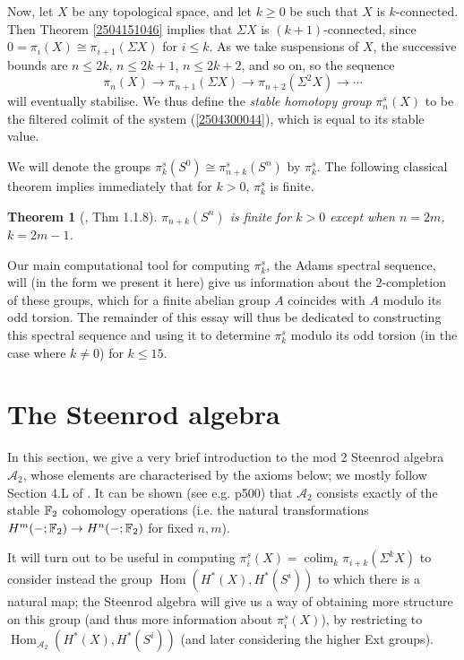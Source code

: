 \documentclass[11pt, titlepage]{article} %
\def\bb{\ensuremath\mathbb}
\def\A{\ensuremath{\mathscr{A}_2}}
\DeclareMathOperator{\colim}{colim}
\DeclareMathOperator{\Hom}{Hom}
\numberwithin{equation}{subsection}
\theoremstyle{plain}
\newtheorem{theorem}{Theorem}[subsection]
\theoremstyle{definition}
\begin{document}
Now, let \(X\) be any topological space, and let \(k\geq 0\) be such that \(X\) is \(k\)-connected. Then Theorem \ref{2504151046} implies that \(\Sigma X\) is \((k+1)\)-connected, since \(0=\pi_i(X)\cong \pi_{i+1}(\Sigma X)\) for \(i\leq k\). As we take suspensions of \(X\), the successive bounds are \(n \leq 2k\), \(n \leq 2k+1\), \(n\leq 2k+2\), and so on, so the sequence 
\begin{equation}\label{2504300044}
\pi_n(X)\to \pi_{n+1}(\Sigma X) \to \pi_{n+2}(\Sigma^2 X) \to \cdots
\end{equation}
will eventually stabilise. We thus define the \textit{stable homotopy group} \(\pi_n^s(X)\) to be the filtered colimit of the system (\ref{2504300044}), which is equal to its stable value. 

We will denote the groups \(\pi_k^s(S^0)\cong \pi^s_{n+k}(S^n)\) by \(\pi_k^s\). The following classical theorem implies immediately that for \(k>0\), \(\pi_k^s\) is finite.

\begin{theorem}[{\autocite{cobordism}, Thm 1.1.8}]
\(\pi_{n+k}(S^n)\) is finite for \(k>0\) except when \(n=2m\), \(k=2m-1\). 
\end{theorem}

Our main computational tool for computing \(\pi_k^s\), the Adams spectral sequence, will (in the form we present it here) give us information about the \(2\)-completion of these groups, which for a finite abelian group \(A\) coincides with \(A\) modulo its odd torsion. The remainder of this essay will thus be dedicated to constructing this spectral sequence and using it to determine \(\pi_k^s\) modulo its odd torsion (in the case where \(k\neq 0\)) for \(k \leq 15\). 

\section{The Steenrod algebra}\label{2503221247}

In this section, we give a very brief introduction to the mod 2 Steenrod algebra \(\A\), whose elements are characterised by the axioms below; we mostly follow Section 4.L of \autocite{hatcher}. It can be shown (see e.g. \autocite{hatcher} p500) that \(\A\) consists exactly of the stable \(\bb{F}_2\) cohomology operations (i.e. the natural transformations \(H^m(-;\bb{F}_2)\to H^n(-; \bb{F}_2)\) for fixed \(n,m\)). 

It will turn out to be useful in computing \(\pi_i^s(X)=\colim_k \pi_{i+k}(\Sigma^k X)\) to consider instead the group \(\Hom(H^*(X), H^*(S^i))\) to which there is a natural map; the Steenrod algebra will give us a way of obtaining more structure on this group (and thus more information about \(\pi_i^s(X)\)), by restricting to \(\Hom_{\A}(H^*(X), H^*(S^i))\) (and later considering the higher Ext groups).  
\end{document}
